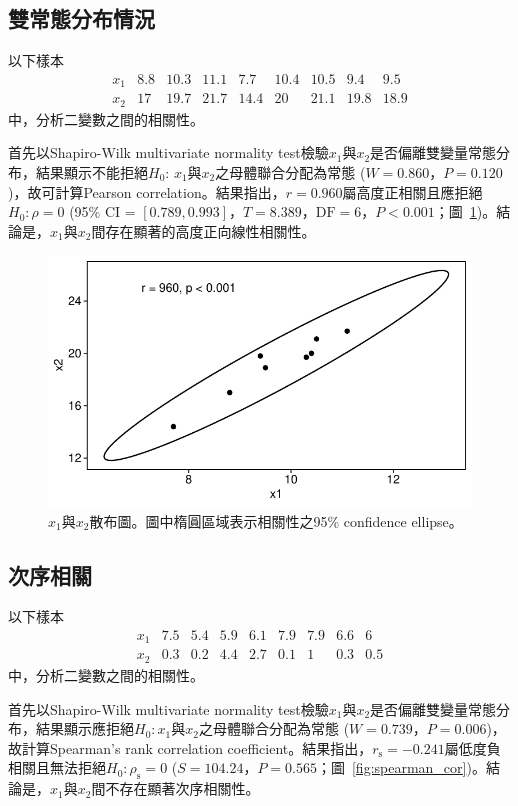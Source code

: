 \documentclass[12pt]{article}
\renewcommand{\figurename}{圖}
\newcommand*{\figref}[1]{\figurename~\ref{#1}}
\begin{document}
\subsection{雙常態分布情況}
以下樣本
\[
\begin{matrix}
x_1 & 8.8 & 10.3 & 11.1 & 7.7 & 10.4 & 10.5 & 9.4 & 9.5\\
x_2 & 17 & 19.7 & 21.7 & 14.4 & 20 & 21.1 & 19.8 & 18.9
\end{matrix}
\]
中，分析二變數之間的相關性。

首先以Shapiro-Wilk multivariate normality test檢驗$x_1$與$x_2$是否偏離雙變量常態分布，結果顯示不能拒絕$H_0$: $x_1$與$x_2$之母體聯合分配為常態 ($W = 0.860$，$P = 0.120$)，故可計算Pearson correlation。結果指出，$r = 0.960$屬高度正相關且應拒絕$H_0:\rho=0$ (95\% CI = $\left[ 0.789, 0.993\right]$，$T = 8.389$，$\text{DF} = 6$，$P < 0.001$；\figref{fig:simple_cor})。結論是，$x_1$與$x_2$間存在顯著的高度正向線性相關性。

\begin{figure}[htbp]
	\centering
	\includegraphics[]{simple_cor.pdf}
	\caption{$x_1$與$x_2$散布圖。圖中楕圓區域表示相關性之95\% confidence ellipse。}
	\label{fig:simple_cor}
\end{figure}

\subsection{次序相關}
以下樣本
\[
\begin{matrix}
x_1 & 7.5 & 5.4 & 5.9 & 6.1 & 7.9 & 7.9 & 6.6 & 6\\
x_2 & 0.3 & 0.2 & 4.4 & 2.7 & 0.1 & 1 & 0.3 & 0.5
\end{matrix}
\]
中，分析二變數之間的相關性。

首先以Shapiro-Wilk multivariate normality test檢驗$x_1$與$x_2$是否偏離雙變量常態分布，結果顯示應拒絕$H_0: x_1與x_2之母體聯合分配為常態$ ($W = 0.739$，$P = 0.006$)，故計算Spearman's rank correlation coefficient。結果指出，$r_\mathrm{s} = -0.241$屬低度負相關且無法拒絕$H_0:\rho_\mathrm{s}=0$ ($S = 104.24$，$P=0.565$；\figref{fig:spearman_cor})。結論是，$x_1$與$x_2$間不存在顯著次序相關性。
\end{document}
